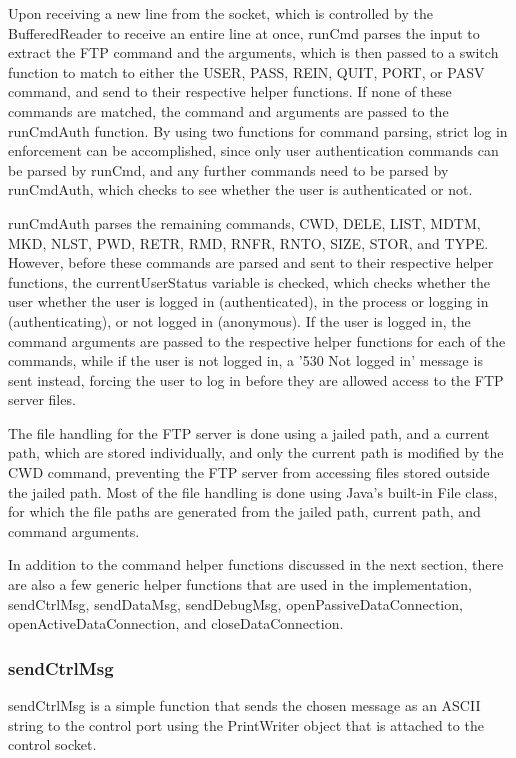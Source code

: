 \documentclass[11pt,a4paper,titlepage]{article}
\begin{document}
Upon receiving a new line from the socket, which is controlled by the BufferedReader to receive an entire line at once, runCmd parses the input to extract the FTP command and the arguments, which is then passed to a switch function to match to either the USER, PASS, REIN, QUIT, PORT, or PASV command, and send to their respective helper functions. If none of these commands are matched, the command and arguments are passed to the runCmdAuth function. By using two functions for command parsing, strict log in enforcement can be accomplished, since only user authentication commands can be parsed by runCmd, and any further commands need to be parsed by runCmdAuth, which checks to see whether the user is authenticated or not.

runCmdAuth parses the remaining commands, CWD, DELE, LIST, MDTM, MKD, NLST, PWD, RETR, RMD, RNFR, RNTO, SIZE, STOR, and TYPE. However, before these commands are parsed and sent to their respective helper functions, the currentUserStatus variable is checked, which checks whether the user whether the user is logged in (authenticated), in the process or logging in (authenticating), or not logged in (anonymous). If the user is logged in, the command arguments are passed to the respective helper functions for each of the commands, while if the user is not logged in, a '530 Not logged in' message is sent instead, forcing the user to log in before they are allowed access to the FTP server files.

The file handling for the FTP server is done using a jailed path, and a current path, which are stored individually, and only the current path is modified by the CWD command, preventing the FTP server from accessing files stored outside the jailed path. Most of the file handling is done using Java's built-in File class, for which the file paths are generated from the jailed path, current path, and command arguments.

In addition to the command helper functions discussed in the next section, there are also a few generic helper functions that are used in the implementation, sendCtrlMsg, sendDataMsg, sendDebugMsg, openPassiveDataConnection, openActiveDataConnection, and closeDataConnection.

\subsubsection{sendCtrlMsg}
sendCtrlMsg is a simple function that sends the chosen message as an ASCII string to the control port using the PrintWriter object that is attached to the control socket.
\end{document}
